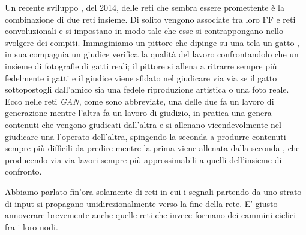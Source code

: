 Un recente sviluppo , del 2014, delle reti che sembra essere promettente è la combinazione di due reti insieme. Di solito vengono associate tra loro FF e reti convoluzionali e si impostano in modo tale che esse si contrappongano nello svolgere dei compiti. Immaginiamo un pittore che dipinge su una tela un gatto , in sua compagnia un giudice verifica la qualità del lavoro confrontandolo che un insieme di fotografie di gatti reali; il pittore si allena a ritrarre sempre più fedelmente i gatti e il giudice viene sfidato nel giudicare via via se il gatto sottopostogli dall'amico sia una fedele riproduzione artistica o una foto reale. Ecco nelle reti \textit{GAN}, come sono abbreviate, una delle due fa un lavoro di generazione mentre l'altra fa un lavoro di giudizio, in pratica una genera contenuti che vengono giudicati dall'altra e si allenano vicendevolmente nel giudicare una l'operato dell'altra, spingendo la seconda a produrre contenuti sempre più difficili da predire mentre la prima viene allenata dalla seconda , che producendo via via lavori sempre più approssimabili a quelli dell'insieme di confronto.

Abbiamo parlato fin'ora solamente di reti in cui i segnali partendo da uno strato di input si propagano unidirezionalmente verso la fine della rete. E' giusto annoverare brevemente anche quelle reti che invece formano dei cammini ciclici fra i loro nodi.